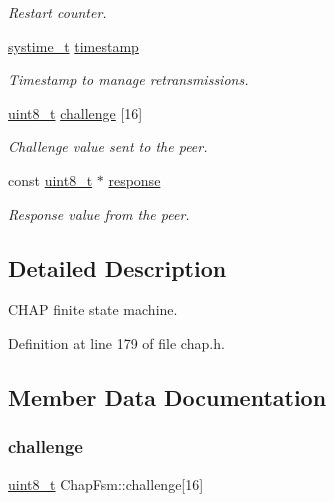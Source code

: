 \begin{DoxyCompactItemize}
\begin{DoxyCompactList}\small\item\em Restart counter. \end{DoxyCompactList}\item 
\hyperlink{compiler__port_8h_ae3e32a98d431a02106616da3071832dd}{systime\+\_\+t} \hyperlink{structChapFsm_a7e91539f8fa40405116322e70e810728}{timestamp}
\begin{DoxyCompactList}\small\item\em Timestamp to manage retransmissions. \end{DoxyCompactList}\item 
\hyperlink{stdint_8h_aba7bc1797add20fe3efdf37ced1182c5}{uint8\+\_\+t} \hyperlink{structChapFsm_a04d0413b963cbf767cb4578a677ab0f7}{challenge} \mbox{[}16\mbox{]}
\begin{DoxyCompactList}\small\item\em Challenge value sent to the peer. \end{DoxyCompactList}\item 
const \hyperlink{stdint_8h_aba7bc1797add20fe3efdf37ced1182c5}{uint8\+\_\+t} $\ast$ \hyperlink{structChapFsm_af52570dc74a434f2ca9122a89a1ca241}{response}
\begin{DoxyCompactList}\small\item\em Response value from the peer. \end{DoxyCompactList}\end{DoxyCompactItemize}


\subsection{Detailed Description}
C\+H\+AP finite state machine. 

Definition at line 179 of file chap.\+h.



\subsection{Member Data Documentation}
\mbox{\label{structChapFsm_a04d0413b963cbf767cb4578a677ab0f7}} 
\subsubsection{\texorpdfstring{challenge}{challenge}}
{\footnotesize\ttfamily \hyperlink{stdint_8h_aba7bc1797add20fe3efdf37ced1182c5}{uint8\+\_\+t} Chap\+Fsm\+::challenge\mbox{[}16\mbox{]}}



